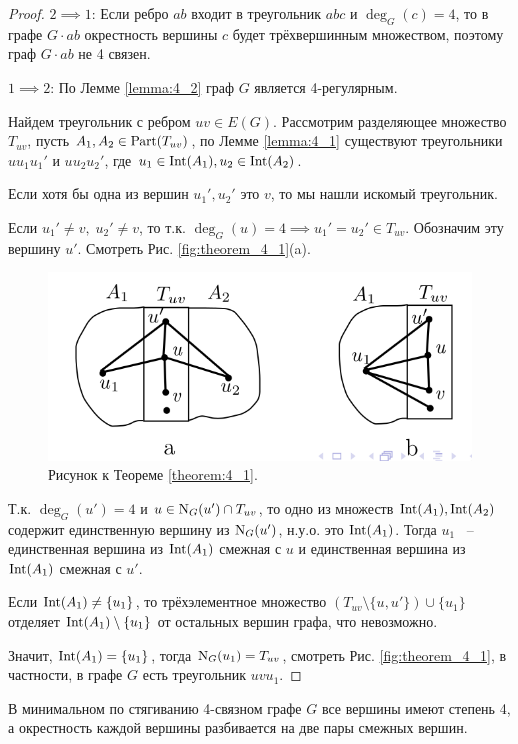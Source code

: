 \begin{proof}
	$2 \implies 1$: Если ребро $ab$ входит в треугольник  $abc$ и  $\deg_G(c) = 4$, то в графе  $G \cdot ab$ окрестность вершины  $c$ будет трёхвершинным множеством, поэтому граф  $G \cdot ab$ не 4 связен.

	$1 \implies 2$: По Лемме \ref{lemma:4_2} граф  $G$ является 4-регулярным.

	Найдем треугольник с ребром $uv \in E(G)$. 
	Рассмотрим разделяющее множество $T_{uv}$, пусть $A_1, A_2 \in \operatorname{Part}(T_{uv})$, по Лемме \ref{lemma:4_1} существуют треугольники $u u_1 u_1'$ и $u u_2 u_2'$, где $u_1 \in \operatorname{Int}(A_1), u_2 \in \operatorname{Int}(A_2)$.

	Если хотя бы одна из вершин $u_1', u_2'$ это $v$, то мы нашли искомый треугольник.

	Если  $u_1' \neq v, \; u_2' \neq v$, то т.к. $\deg_G(u) = 4 \implies u_1' = u_2' \in T_{uv}$. Обозначим эту вершину $u'$. Смотреть Рис. \eqref{fig:theorem_4_1}(a).

	\begin{figure}[ht]
    \centering
	\includegraphics[width=0.5\columnwidth]{figures/theorem_4_1.png}
	\caption{Рисунок к Теореме \ref{theorem:4_1}.}
    \label{fig:theorem_4_1}
	\end{figure}

	Т.к. $\deg_G(u') = 4$ и  $u \in \operatorname{N}_G(u') \cap T_{uv}$, то одно из множеств $\operatorname{Int}(A_1), \operatorname{Int}(A_2)$ содержит единственную вершину из $\operatorname{N}_G(u')$, н.у.о. это  $\operatorname{Int}(A_1)$.
	Тогда $u_1$ ~-- единственная вершина из $\operatorname{Int}(A_1)$ смежная с $u$ и единственная вершина из  $\operatorname{Int}(A_1)$ смежная с $u'$.

	Если  $\operatorname{Int}(A_1) \neq \{u_1\}$, то трёхэлементное множество $(T_{uv} \setminus \{u, u'\}) \cup \{u_1\}$ отделяет $\operatorname{Int}(A_1) \setminus \{u_1\}$ от остальных вершин графа, что невозможно.

	Значит, $\operatorname{Int}(A_1) = \{u_1\}$, тогда $\operatorname{N}_G(u_1) = T_{uv}$, смотреть Рис. \eqref{fig:theorem_4_1}, в частности, в графе $G$ есть треугольник  $uvu_1$.

\end{proof}

\begin{customcrly}{4.1} \label{crly:4_1}
	В минимальном по стягиванию 4-связном графе $G$ все вершины имеют степень 4, а окрестность каждой вершины разбивается на две пары смежных вершин.
\end{customcrly}

